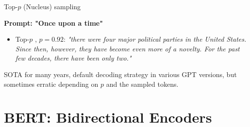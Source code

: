 
\begin{vbframe}{Top-$p$ (Nucleus) sampling}

\vfill
\textbf{Prompt: "Once upon a time"}
\begin{itemize}
    \item Top-$p$ , $p = 0.92$: \textit{"there were four major political parties in the United States. Since then, however, they have become even more of a novelty. For the past few decades, there have been only two."}
\end{itemize}

\vspace{2ex}

SOTA for many years, default decoding strategy in various GPT versions, but sometimes erratic depending on $p$ and the sampled tokens.\\

\vspace{2ex}

  
\end{vbframe}

\section{BERT: Bidirectional Encoders}

